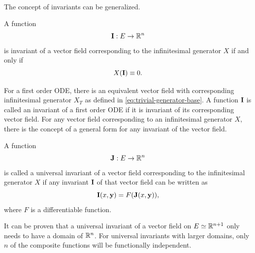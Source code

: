 The concept of invariants can be generalized.
\begin{defn}
  A function
  \begin{equation}
    \vb{I}: E \to \mathbb{R}^n
  \end{equation}
  is invariant of a vector field corresponding to the infinitesimal generator \(X\) if and only if
  \begin{equation}
    X(\vb{I}) \equiv 0.
  \end{equation}
\end{defn}
For a first order ODE, there is an equivalent vector field with corresponding infinitesimal generator \(X_T\) as defined in \cref{eq:trivial-generator-base}.
A function \(\vb{I}\) is called an invariant of a first order ODE if it is invariant of its corresponding vector field.
For any vector field corresponding to an infinitesimal generator \(X\), there is the concept of a general form for any invariant of the vector field.
\begin{defn}
  A function
  \begin{equation}
    \vb{J}: E \to \mathbb{R}^n
  \end{equation}
  is called a universal invariant of a vector field corresponding to the infinitesimal generator \(X\) if any invariant \(\vb{I}\) of that vector field can be written as
  \begin{equation}
    \vb{I}(x, \vb{y}) = F(\vb{J}(x, \vb{y})),
  \end{equation}
  where \(F\) is a differentiable function.
\end{defn}
It can be proven that a universal invariant of a vector field on \(E \simeq \mathbb{R}^{n+1}\) only needs to have a domain of \(\mathbb{R}^n\).
For universal invariants with larger domains, only \(n\) of the composite functions will be functionally independent.

